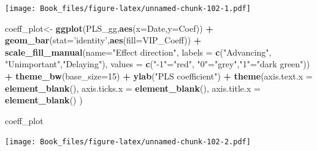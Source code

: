 \documentclass[
]{book}
\newenvironment{Shaded}{\begin{snugshade}}{\end{snugshade}}
\newcommand{\DataTypeTok}[1]{\textcolor[rgb]{0.13,0.29,0.53}{#1}}
\newcommand{\DecValTok}[1]{\textcolor[rgb]{0.00,0.00,0.81}{#1}}
\newcommand{\KeywordTok}[1]{\textcolor[rgb]{0.13,0.29,0.53}{\textbf{#1}}}
\newcommand{\NormalTok}[1]{#1}
\newcommand{\OperatorTok}[1]{\textcolor[rgb]{0.81,0.36,0.00}{\textbf{#1}}}
\newcommand{\StringTok}[1]{\textcolor[rgb]{0.31,0.60,0.02}{#1}}
\begin{document}
\texttt{[image: Book\_files/figure-latex/unnamed-chunk-102-1.pdf]}

\begin{Shaded}
\begin{Highlighting}[]
\NormalTok{coeff_plot<-}\StringTok{ }\KeywordTok{ggplot}\NormalTok{(PLS_gg,}\KeywordTok{aes}\NormalTok{(}\DataTypeTok{x=}\NormalTok{Date,}\DataTypeTok{y=}\NormalTok{Coef)) }\OperatorTok{+}
\StringTok{  }\KeywordTok{geom_bar}\NormalTok{(}\DataTypeTok{stat=}\StringTok{'identity'}\NormalTok{,}\KeywordTok{aes}\NormalTok{(}\DataTypeTok{fill=}\NormalTok{VIP_Coeff)) }\OperatorTok{+}
\StringTok{  }\KeywordTok{scale_fill_manual}\NormalTok{(}\DataTypeTok{name=}\StringTok{"Effect direction"}\NormalTok{, }
                    \DataTypeTok{labels =} \KeywordTok{c}\NormalTok{(}\StringTok{"Advancing"}\NormalTok{, }\StringTok{"Unimportant"}\NormalTok{,}\StringTok{"Delaying"}\NormalTok{), }
                    \DataTypeTok{values =} \KeywordTok{c}\NormalTok{(}\StringTok{"-1"}\NormalTok{=}\StringTok{"red"}\NormalTok{, }\StringTok{"0"}\NormalTok{=}\StringTok{"grey"}\NormalTok{,}\StringTok{"1"}\NormalTok{=}\StringTok{"dark green"}\NormalTok{)) }\OperatorTok{+}
\StringTok{  }\KeywordTok{theme_bw}\NormalTok{(}\DataTypeTok{base_size=}\DecValTok{15}\NormalTok{) }\OperatorTok{+}
\StringTok{  }\KeywordTok{ylab}\NormalTok{(}\StringTok{"PLS coefficient"}\NormalTok{) }\OperatorTok{+}
\StringTok{  }\KeywordTok{theme}\NormalTok{(}\DataTypeTok{axis.text.x =} \KeywordTok{element_blank}\NormalTok{(),}
        \DataTypeTok{axis.ticks.x =} \KeywordTok{element_blank}\NormalTok{(),}
        \DataTypeTok{axis.title.x =} \KeywordTok{element_blank}\NormalTok{() )}

\NormalTok{coeff_plot}
\end{Highlighting}
\end{Shaded}

\texttt{[image: Book\_files/figure-latex/unnamed-chunk-102-2.pdf]}
\end{document}
